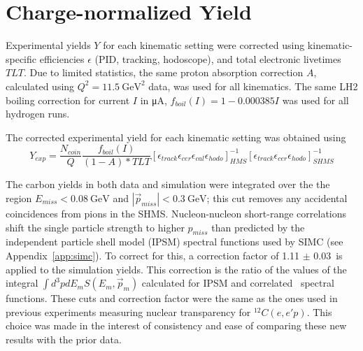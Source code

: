 \section{Charge-normalized Yield}
Experimental yields $Y$ for each kinematic setting were corrected using
kinematic-specific efficiencies $\epsilon$
(PID, tracking, hodoscope), and
total electronic livetimes $TLT$.
Due to limited statistics, the same proton absorption correction $A$,
calculated using $Q^2=\SI{11.5}{\giga\electronvolt\squared}$ data,
was used for all kinematics.
The same LH2 boiling correction for current $I$ in \si{\micro\ampere},
$f_{boil}(I)=1-0.000385I$
was used for all hydrogen runs.

The corrected experimental yield for each kinematic setting was obtained using
\begin{equation}
Y_{exp} = \frac{N_{coin}}{Q}
          \frac{f_{boil}(I)}{(1-A) * TLT}
          \left[
              \epsilon_{track}
              \epsilon_{cer}
              \epsilon_{cal}
              \epsilon_{hodo}
          \right]_{HMS}^{-1}
          \left[
              \epsilon_{track}
              \epsilon_{cer}
              \epsilon_{hodo}
          \right]_{SHMS}^{-1}
\end{equation}


The carbon yields in both data and simulation were integrated over
the the region
$E_{miss} < \SI{0.08}{\giga\electronvolt}$
and
$|\vec{p}_{miss}| < \SI{0.3}{\giga\electronvolt}$; this cut removes
any accidental coincidences from pions in the SHMS.
Nucleon-nucleon short-range correlations shift the single particle strength
to higher $p_{miss}$ than predicted by the independent particle shell model
(IPSM) spectral functions used by SIMC (see Appendix~\ref{app:simc}).
To correct for this, a correction factor of 1.11 $\pm$ 0.03\,\cite{ONeill_1995}
is applied to the simulation yields.
This correction is the ratio of the values of the integral
$\int d^3p dE_m S(E_m,\vec{p}_m)$
calculated for IPSM and correlated~\cite{VanOrden_1980} spectral functions.
These cuts and correction factor were the same as the ones used in
previous experiments measuring nuclear transparency for ${}^{12}C(e,e'p)$.
This choice was made in the interest of consistency and ease of comparing these
new results with the prior data.
